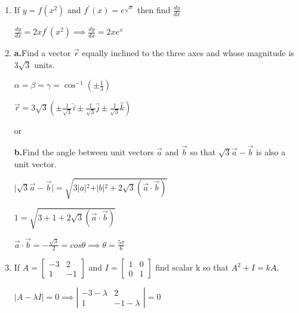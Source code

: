 \begin{enumerate}[label=\thesubsection.\arabic*, ref=\thesubsection.\theenumi]
$$ye^{\int -\frac{1}{x}dx} = \int 2xe^{\int -\frac{1}{x}dx}dx$$

integrating factor  $e^{\int -\frac{1}{x}dx}$


\item

If $y=f(x^{2})$ and $f^{\prime}(x)=e^{\sqrt{x}}$ then find $\frac{dy}{dx}$

\solution

$\frac{dy}{dx}= 2xf^\prime(x^2) \implies \frac{dy}{dx}= 2xe^x$


\item

\textbf{a.}Find a vector $\vec{r}$ equally inclined to the three axes and whose magnitude is $3\sqrt{3}$ units. 

\solution

$\alpha =\beta=\gamma= \cos^{-1}(\pm\frac{1}{3})$

$\overrightarrow{r}=3\sqrt{3}\left(\pm\frac{1}{\sqrt{3}}\hat{i} \pm\frac{1}{\sqrt{3}}\hat{j} \pm\frac{1}{\sqrt{3}}\hat{k}\right)$ 

\begin{center}
    or
\end{center}


\textbf{b.}Find the angle between unit vectors $\vec{a}$ and $\vec{b}$ so that $\sqrt{3}\vec{a}-\vec{b}$ is also a unit vector.   

\solution

$\vert{}\sqrt{3}\overrightarrow{a}-\overrightarrow{b}\vert{}=\sqrt{3\vert{a}\vert{}^2 + \vert{b}\vert{}^2 +2\sqrt{3}\left(\overrightarrow{a}\cdot\overrightarrow{b}\right)}$

$1 = \sqrt{3 + 1 +2\sqrt{3}\left(\overrightarrow{a}\cdot\overrightarrow{b}\right)}$

$\overrightarrow{a}\cdot\overrightarrow{b}= -\frac{\sqrt{3}}{2} = cos\theta \implies \theta = \frac{5\pi}{6}$

\item

If $A=\left[\begin{matrix}-3&2\\ 1&-1\end{matrix}\right]$ and $I=\left[\begin{matrix}1&0\\ 0&1\end{matrix}\right]$ find scalar k so that $A^{2}+I=kA.$

\solution

$\vert{}A-\lambda I\vert{}= 0 \implies \left|\begin{matrix}
    -3-\lambda & 2\\ 1& -1-\lambda\end{matrix} \right|= 0$


\end{enumerate}
